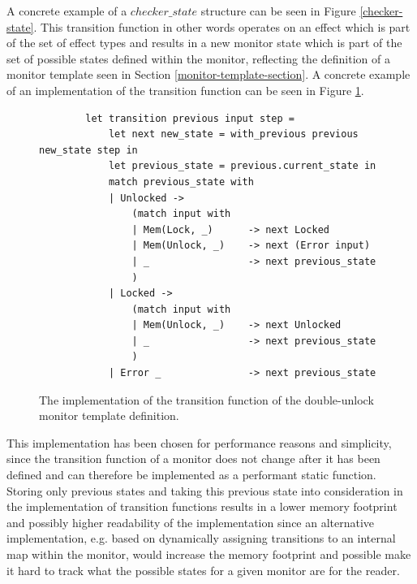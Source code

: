 \newpar A concrete example of a $checker\_state$ structure can be seen in Figure \ref{checker-state}. This transition function in other words operates on an effect which is part of the set of effect types and results in a new monitor state which is part of the set of possible states defined within the monitor, reflecting the definition of a monitor template seen in Section \ref{monitor-template-section}. A concrete example of an implementation of the transition function can be seen in Figure \ref{transition-implementation}. 

\begin{figure}[H]
    \centering
    \begin{verbatim}
        let transition previous input step = 
            let next new_state = with_previous previous new_state step in
            let previous_state = previous.current_state in 
            match previous_state with 
            | Unlocked ->
                (match input with 
                | Mem(Lock, _)      -> next Locked
                | Mem(Unlock, _)    -> next (Error input)
                | _                 -> next previous_state
                )
            | Locked ->
                (match input with 
                | Mem(Unlock, _)    -> next Unlocked
                | _                 -> next previous_state
                )
            | Error _               -> next previous_state
    \end{verbatim}
    \caption{The implementation of the transition function of the double-unlock monitor template definition.}
    \label{transition-implementation}
\end{figure}

\newpar This implementation has been chosen for performance reasons and simplicity, since the transition function of a monitor does not change after it has been defined and can therefore be implemented as a performant static function. Storing only previous states and taking this previous state into consideration in the implementation of transition functions results in a lower memory footprint and possibly higher readability of the implementation since an alternative implementation, e.g. based on dynamically assigning transitions to an internal map within the monitor, would increase the memory footprint and possible make it hard to track what the possible states for a given monitor are for the reader.

